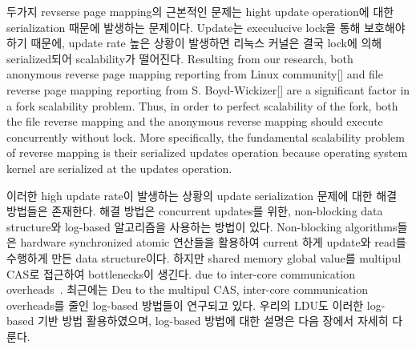 \ifkor
두가지 revserse page mapping의 근본적인 문제는 hight update operation에 대한 serialization 때문에
발생하는 문제이다.
Update는 execulucive lock을 통해 보호해야하기 때문에, update rate 높은 상황이 발생하면 리눅스
커널은 결국 lock에 의해 serialized되어 scalability가 떨어진다.
\else
Resulting from our research, both anonymous reverse page mapping reporting
from Linux community[] and file reverse page mapping reporting
from S. Boyd-Wickizer[] are a significant factor in a fork scalability
problem.
Thus, in order to perfect scalability of the fork, both the
file reverse mapping and the anonymous reverse mapping should execute
concurrently without lock.
More specifically, the fundamental scalability problem of reverse mapping is
their serialized updates operation because operating system kernel are serialized at the updates
operation.



\fi


\ifkor
이러한 high update rate이 발생하는 상황의 update serialization 문제에 대한 해결 방법들은 존재한다. 
해결 방법은 concurrent updates를 위한, non-blocking data structure와
log-based 알고리즘을 사용하는 방법이 있다.
Non-blocking algorithms들은 hardware synchronized atomic 연산들을 활용하여 current 하게
update와 read를 수행하게 만든 data structure이다.
하지만 shared memory global value를 multipul CAS로 접근하여 bottlenecks이 생긴다.
due to inter-core communication overheads~\cite{SilasBoydWickizerPth}.
최근에는 Deu to the multipul CAS, inter-core communication overheads를 줄인 log-based
방법들이 연구되고 있다.
우리의 LDU도 이러한 log-based 기반 방법 활용하였으며, log-based 방법에 대한 설명은 다음 장에서 자세히 다룬다.
\else

